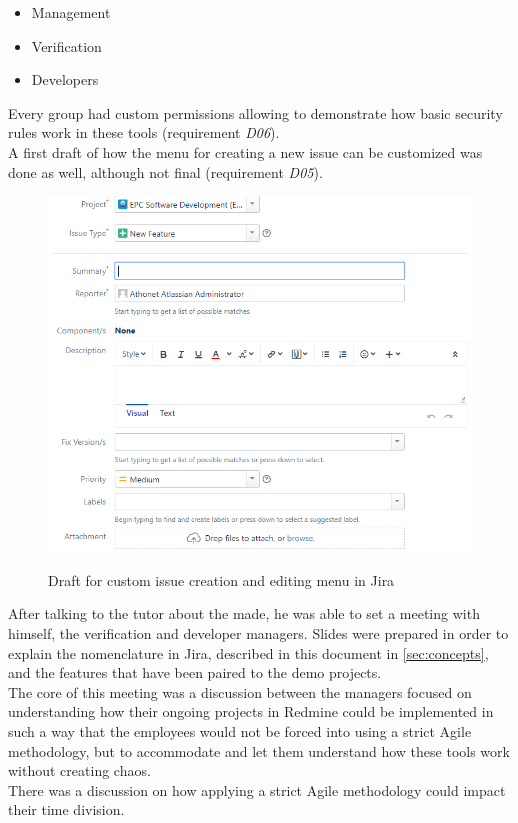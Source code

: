 	\begin{itemize}
		\item Management
		\item Verification
		\item Developers
	\end{itemize}
	Every group had custom permissions allowing to demonstrate how basic security rules work in these tools (requirement \textit{D06}).\\
	A first draft of how the menu for creating a new issue can be customized was done as well, although not final (requirement \textit{D05}). 
	\begin{figure}[H]
		\centering
		\includegraphics[width=.9\textwidth]{resources/Annotation2019-07-24170502A}\\
		\caption{Draft for custom issue creation and editing menu in Jira}
	\end{figure}
	After talking to the tutor about the made, he was able to set a meeting with himself, the verification and developer managers.
	Slides were prepared in order to explain the nomenclature in Jira, described in this document in \ref{sec:concepts}, and the features that have been paired to the demo projects.\\
	The core of this meeting was a discussion between the managers focused on understanding how their ongoing projects in Redmine could be implemented in such a way that the employees would not be forced into using a strict Agile methodology, but to accommodate and let them understand how these tools work without creating chaos.\\
	There was a discussion on how applying a strict Agile methodology could impact their time division.
